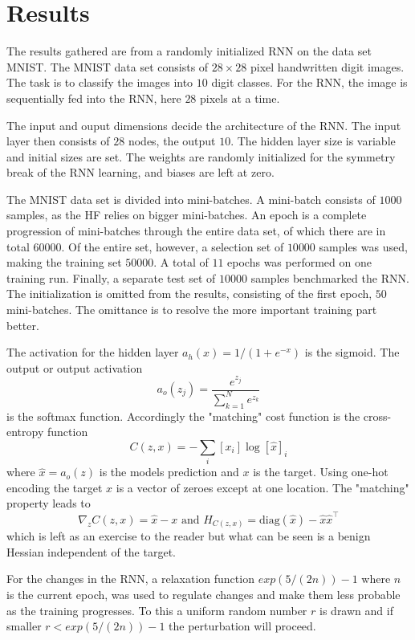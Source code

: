 \chapter{Results}

The results gathered are from a randomly initialized RNN on the data set MNIST. The MNIST data set consists of $28 \times 28$ pixel handwritten digit images. The task is to classify the images into $10$ digit classes. For the RNN, the image is sequentially fed into the RNN, here $28$ pixels at a time. 

The input and ouput dimensions decide the architecture of the RNN. The input layer then consists of $28$ nodes, the output $10$. The hidden layer size is variable and initial sizes are set. The weights are randomly initialized for the symmetry break of the RNN learning, and biases are left at zero. 

The MNIST data set is divided into mini-batches. A mini-batch consists of $1000$ samples, as the HF relies on bigger mini-batches. An epoch is a complete progression of mini-batches through the entire data set, of which there are in total $60 000$. Of the entire set, however, a selection set of $10 000$ samples was used, making the training set $50000$. A total of $11$ epochs was performed on one training run. Finally, a separate test set of $10000$ samples benchmarked the RNN. The initialization is omitted from the results, consisting of the first epoch, $50$ mini-batches. The omittance is to resolve the more important training part better.

The activation for the hidden layer $a_h(x) = 1/(1 + e^{-x})$ is the sigmoid. The output or output activation \[a_o(z_j) = \frac{e^{z_j}}{\sum_{k=1}^N e^{z_k}}\] is the softmax function. Accordingly the "matching" cost function is the cross-entropy function \[C(z,x) = - \sum_i [x_i] \log [\hat{x}]_i\] where $\hat{x} = a_o(z)$ is the models prediction and $x$ is the target. Using one-hot encoding the target $x$ is a vector of zeroes except at one location. The "matching" property leads to \[\nabla_z C(z,x) = \hat{x} - x \text{ and } H_{C(z,x)} = \text{diag}(\hat{x}) - \hat{x} \hat{x}^\top\] which is left as an exercise to the reader but what can be seen is a benign Hessian independent of the target. 

For the changes in the RNN, a relaxation function $exp(5/(2n)) - 1$ where $n$ is the current epoch, was used to regulate changes and make them less probable as the training progresses. To this a uniform random number $r$ is drawn and if smaller $ r < exp(5/(2n)) - 1$ the perturbation will proceed.

